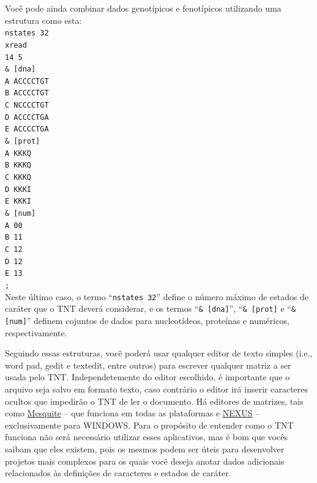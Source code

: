 \begin{refsection}
Você pode ainda combinar dados genotípicos e fenotípicos utilizando uma estrutura como esta:
\\
\indent\indent\texttt{nstates 32}\\
\indent\indent\texttt{xread}\\
\indent\indent\texttt{14 5}\\
\indent\indent\texttt{\& [dna]}\\
\indent\indent\texttt{A ACCCCTGT}\\
\indent\indent\texttt{B ACCCCTGT}\\
\indent\indent\texttt{C NCCCCTGT}\\
\indent\indent\texttt{D ACCCCTGA}\\
\indent\indent\texttt{E ACCCCTGA}\\
\indent\indent\texttt{\& [prot]}\\
\indent\indent\texttt{A  KKKQ}\\
\indent\indent\texttt{B  KKKQ}\\
\indent\indent\texttt{C  KKKQ}\\
\indent\indent\texttt{D  KKKI}\\
\indent\indent\texttt{E  KKKI}\\
\indent\indent\texttt{\& [num]}\\
\indent\indent\texttt{A  00}\\
\indent\indent\texttt{B  11}\\
\indent\indent\texttt{C  12}\\
\indent\indent\texttt{D  12}\\
\indent\indent\texttt{E  13}\\
\indent\indent\texttt{;}\\

Neste último caso, o termo ``\texttt{nstates 32}'' define o número máximo de estados de caráter que o TNT deverá considerar, e os termos  ``\texttt{\& [dna]}'',  ``\texttt{\& [prot]} e  ``\texttt{\& [num]}'' definem cojuntos de dados para nucleotídeos, proteínas e numéricos, respectivamente.

Seguindo essas estruturas, você poderá usar qualquer editor de texto simples (i.e., word pad, gedit e textedit, entre outros) para escrever qualquer matriz a ser usada pelo TNT. Independetemente do editor escolhido, é importante que o arquivo seja salvo em formato texto, caso contrário o editor irá inserir caracteres ocultos que impedirão o TNT de ler o documento. Há editores de matrizes, tais como \href{http://www.mesquiteproject.org/}{Mesquite} -- que funciona em todas as plataformas e \href{http://en.bio-soft.net/tree/NDE.html}{NEXUS} -- exclusivamente para WINDOWS. Para o propósito de entender como o TNT funciona não será necessário utilizar esses aplicativos, mas é bom que vocês saibam que eles existem, pois os mesmos podem ser úteis para desenvolver projetos mais complexos para os quais você deseja anotar dados adicionais relacionados às definições de caracteres e estados de caráter.\\



\end{refsection}
